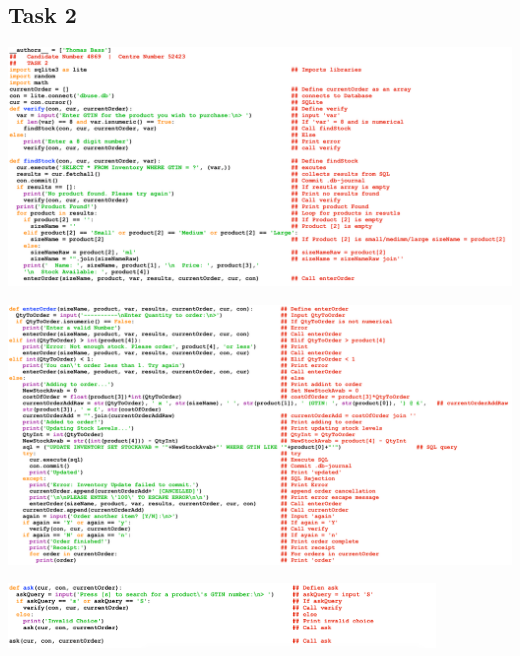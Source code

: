 \documentclass[a4paper]{article}
\begin{document}
\subsection{Task 2}
\noindent\includegraphics[width=1\textwidth, left]{task2FINALCODE1.png} \par
\noindent\includegraphics[width=1.039\textwidth, left]{task2FINALCODE2.png} \par
\noindent\includegraphics[width=0.85\textwidth, left]{task2FINALCODE3.png}
\newpage
\end{document}
